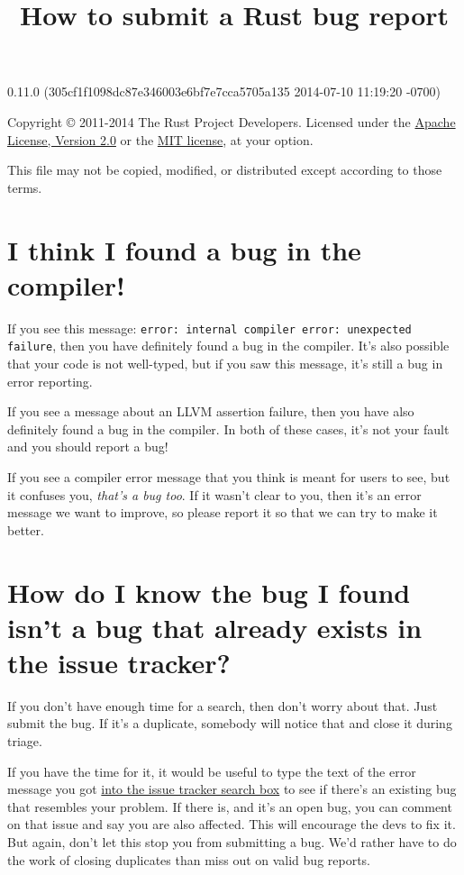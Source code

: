 \documentclass[]{article}
\title{How to submit a Rust bug report}
\begin{document}
\maketitle

0.11.0 (305cf1f1098dc87e346003e6bf7e7cca5705a135 2014-07-10 11:19:20 -0700)

Copyright © 2011-2014 The Rust Project Developers. Licensed under the
\href{http://www.apache.org/licenses/LICENSE-2.0}{Apache License,
Version 2.0} or the \href{http://opensource.org/licenses/MIT}{MIT
license}, at your option.

This file may not be copied, modified, or distributed except according
to those terms.

{
\hypersetup{linkcolor=black}
\setcounter{tocdepth}{3}
\tableofcontents
}
\section{I think I found a bug in the
compiler!}\label{i-think-i-found-a-bug-in-the-compiler}

If you see this message:
\texttt{error: internal compiler error: unexpected failure}, then you
have definitely found a bug in the compiler. It's also possible that
your code is not well-typed, but if you saw this message, it's still a
bug in error reporting.

If you see a message about an LLVM assertion failure, then you have also
definitely found a bug in the compiler. In both of these cases, it's not
your fault and you should report a bug!

If you see a compiler error message that you think is meant for users to
see, but it confuses you, \emph{that's a bug too}. If it wasn't clear to
you, then it's an error message we want to improve, so please report it
so that we can try to make it better.

\section{How do I know the bug I found isn't a bug that already exists
in the issue
tracker?}\label{how-do-i-know-the-bug-i-found-isnt-a-bug-that-already-exists-in-the-issue-tracker}

If you don't have enough time for a search, then don't worry about that.
Just submit the bug. If it's a duplicate, somebody will notice that and
close it during triage.

If you have the time for it, it would be useful to type the text of the
error message you got
\href{https://github.com/rust-lang/rust/issues}{into the issue tracker
search box} to see if there's an existing bug that resembles your
problem. If there is, and it's an open bug, you can comment on that
issue and say you are also affected. This will encourage the devs to fix
it. But again, don't let this stop you from submitting a bug. We'd
rather have to do the work of closing duplicates than miss out on valid
bug reports.
\end{document}
